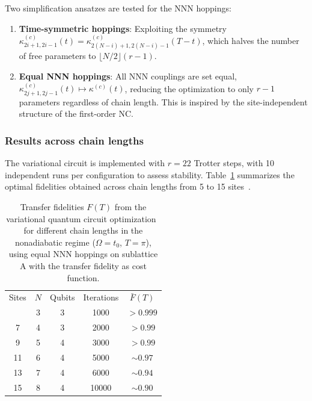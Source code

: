 \documentclass[
  reprint,
  amsmath,
  amssymb,
  aps,
  prb,
  longbibliography,
]{revtex4-2}
\begin{document}
Two simplification ansatzes are tested for the NNN hoppings:
\begin{enumerate}
  \item \textbf{Time-symmetric hoppings}: Exploiting the symmetry
    $\kappa_{2i+1,2i-1}^{(c)}(t) = \kappa_{2(N-i)+1,2(N-i)-1}^{(c)}(T - t)$,
    which halves the number of free parameters to
    $\lfloor N/2 \rfloor (r - 1)$.
  \item \textbf{Equal NNN hoppings}: All NNN couplings are set equal,
    $\kappa_{2j+1,2j-1}^{(c)}(t) \mapsto \kappa^{(c)}(t)$, reducing the
    optimization to only $r - 1$ parameters regardless of chain length.
    This is inspired by the site-independent structure of the first-order NC.
\end{enumerate}

\subsubsection{Results across chain lengths}

The variational circuit is implemented with $r = 22$ Trotter steps, with
10 independent runs per configuration to assess stability.
Table~\ref{tab:cd_fidelities} summarizes the optimal fidelities obtained
across chain lengths from 5 to 15 sites~\cite{Romero2024}.

\begin{table}[b]
  \caption{Transfer fidelities $F(T)$ from the variational quantum circuit
  optimization~\cite{Romero2024} for different chain lengths in the
  nonadiabatic regime ($\Omega = t_0$, $T = \pi$), using equal NNN hoppings
  on sublattice A with the transfer fidelity as cost function.}
  \label{tab:cd_fidelities}
  \begin{ruledtabular}
  \begin{tabular}{ccccc}
    Sites & $N$ & Qubits &
    \textrm{Iterations} & $\bar{F}(T)$ \\
    \colrule
    5  & 3 & 3 & 1000  & $> 0.999$ \\
    7  & 4 & 3 & 2000  & $> 0.99$  \\
    9  & 5 & 4 & 3000  & $> 0.99$  \\
    11 & 6 & 4 & 5000  & $\sim 0.97$ \\
    13 & 7 & 4 & 6000  & $\sim 0.94$ \\
    15 & 8 & 4 & 10000 & $\sim 0.90$ \\
  \end{tabular}
  \end{ruledtabular}
\end{table}
\end{document}
